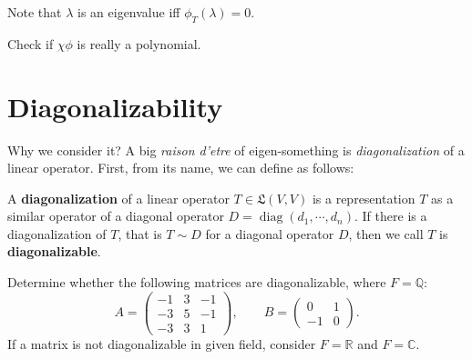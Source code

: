 Note that $\lambda$ is an eigenvalue iff $\phi_T (\lambda) = 0.$
\begin{ex}
Check if $\chi\phi$ is really a polynomial.
\end{ex}

\section{Diagonalizability}

Why we consider it? A big \textit{raison d'etre} of eigen-something is \textit{diagonalization} of a linear operator. First, from its name, we can define as follows:

\begin{defn}[diagonalization]
A \textbf{diagonalization} of a linear operator $T\in \mathfrak L(V,V)$ is a representation $T$ as a similar operator of a diagonal operator $D = \operatorname{diag}(d_1,\cdots,d_n).$ If there is a diagonalization of $T$, that is $T\sim D$ for a diagonal operator $D$, then we call $T$ is \textbf{diagonalizable}.
\end{defn}
\begin{ex}
Determine whether the following matrices are diagonalizable, where $F=\mathbb Q$:
$$A=\begin{pmatrix} -1 & 3 & -1 \\ -3 & 5 & -1 \\ -3 & 3 & 1 \end{pmatrix},\qquad B= \begin{pmatrix} 0 & 1 \\ -1 & 0 \end{pmatrix}. $$ If a matrix is not diagonalizable in given field, consider $F=\mathbb R$ and $F=\mathbb C$.
\end{ex}

